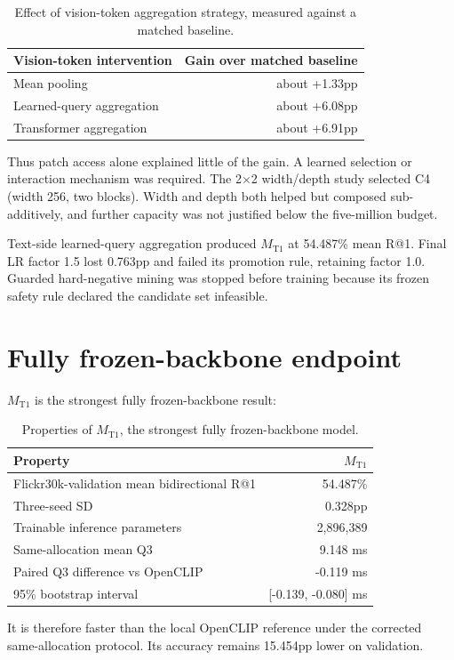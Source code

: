 \documentclass[11pt,a4paper,oneside]{report}
\newcommand{\MTone}{\ensuremath{M_{\mathrm{T1}}}}
\begin{document}
\begin{table}[htbp]
\centering
\caption{Effect of vision-token aggregation strategy, measured against a matched baseline.}
\label{tab:aggregation}
\begin{tabular}{L{7.5cm}r}
\toprule
Vision-token intervention & Gain over matched baseline \\
\midrule
Mean pooling & about +1.33pp \\
Learned-query aggregation & about +6.08pp \\
Transformer aggregation & about +6.91pp \\
\bottomrule
\end{tabular}
\end{table}
Thus patch access alone explained little of the gain. A learned selection or interaction mechanism was required. The 2$\times$2 width/depth study selected C4 (width 256, two blocks). Width and depth both helped but composed sub-additively, and further capacity was not justified below the five-million budget.

Text-side learned-query aggregation produced \MTone{} at 54.487\% mean R@1. Final LR factor 1.5 lost 0.763pp and failed its promotion rule, retaining factor 1.0. Guarded hard-negative mining was stopped before training because its frozen safety rule declared the candidate set infeasible.

\section{Fully frozen-backbone endpoint}
\MTone{} is the strongest fully frozen-backbone result:

\begin{table}[htbp]
\centering
\caption{Properties of \MTone{}, the strongest fully frozen-backbone model.}
\label{tab:mt1}
\begin{tabular}{L{8.5cm}r}
\toprule
Property & \MTone{} \\
\midrule
Flickr30k-validation mean bidirectional R@1 & 54.487\% \\
Three-seed SD & 0.328pp \\
Trainable inference parameters & 2,896,389 \\
Same-allocation mean Q3 & 9.148 ms \\
Paired Q3 difference vs OpenCLIP & -0.119 ms \\
95\% bootstrap interval & [-0.139, -0.080] ms \\
\bottomrule
\end{tabular}
\end{table}
It is therefore faster than the local OpenCLIP reference under the corrected same-allocation protocol. Its accuracy remains 15.454pp lower on validation.
\end{document}
